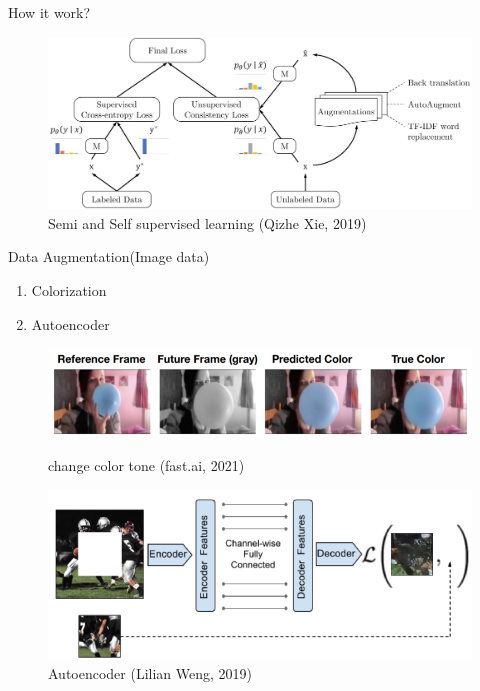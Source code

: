 \documentclass{beamer}
\begin{document}
	\begin{frame}[t]{How it work?}\vspace{4pt}
		\begin{figure}
			\centering
			\includegraphics[scale=0.2]{google_semi.jpg}
			\caption{Semi and Self supervised learning (Qizhe Xie, 2019)}
		\end{figure}
	\end{frame}
	\begin{frame}[t]{Data Augmentation(Image data)}
		\begin{enumerate}
			\item Colorization
			\item Autoencoder
		\end{enumerate}
	\begin{figure}
		\centering
		\includegraphics[scale=0.7]{color.png}
		\caption{change color tone (fast.ai, 2021)}
		\includegraphics[scale=0.71]{inpainting.png}
		\caption{Autoencoder (Lilian Weng, 2019)}
	\end{figure}
	\end{frame}
	
	
	
\end{document}
